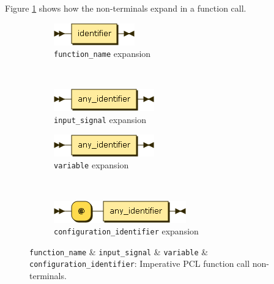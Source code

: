 Figure \ref{fig:imperative-pcl-function-call-non-terminals} shows how the non-terminals expand in a function call.
\begin{figure}[h!]
  \centering
  \begin{subfigure}[b]{0.4\textwidth}
    \includegraphics[scale=\DiagramScale]{chapters/adapter/diagrams/function_name}
    \caption{\texttt{function\_name} expansion}
  \end{subfigure}
  ~
  \begin{subfigure}[b]{0.4\textwidth}
    \includegraphics[scale=\DiagramScale]{chapters/adapter/diagrams/input_signal}
    \caption{\texttt{input\_signal} expansion}
  \end{subfigure}

  \begin{subfigure}[b]{0.4\textwidth}
    \includegraphics[scale=\DiagramScale]{chapters/adapter/diagrams/variable}
    \caption{\texttt{variable} expansion}
  \end{subfigure}
  ~
  \begin{subfigure}[b]{0.4\textwidth}
    \includegraphics[scale=\DiagramScale]{chapters/adapter/diagrams/configuration_identifier}
    \caption{\texttt{configuration\_identifier} expansion}
  \end{subfigure}
  \caption{\texttt{function\_name} \& \texttt{input\_signal} \& \texttt{variable} \& \texttt{configuration\_identifier}: Imperative PCL function call non-terminals.}
  \label{fig:imperative-pcl-function-call-non-terminals}
\end{figure}

